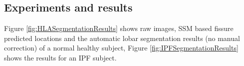 {\subsection{Experiments and results}
Figure \ref{fig:HLASegmentationResults} shows raw images, SSM based fissure predicted locations and the automatic lobar segmentation results (no manual correction) of a normal healthy subject, Figure \ref{fig:IPFSegmentationResults} shows the results for an IPF subject.

\begin{figure}[htbp] 
\centering
\begin{subfigure}{.25\linewidth}%

\end{subfigure}
\end{figure}}
